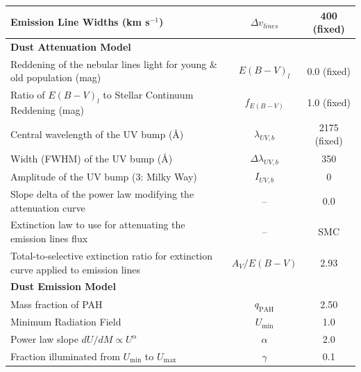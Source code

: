 \documentclass[twocolumn,tight,times,linenumbers]{aastex631}
\begin{document}
\begin{table}
\begin{tabular*}{\textwidth}{@{\extracolsep{\fill}}lcc}
				Emission Line Widths (km s$^{-1}$)											   &  $\Delta v_{lines}$       & 400 (fixed) \\
				\hline
				\textbf{Dust Attenuation Model} \citep{Calzetti2000}    &  &\\ 
				Reddening of the nebular lines light for young \& old population (mag) & $E(B-V)_l$ & 0.0 (fixed) \\
				Ratio of $E(B-V)_l$ to Stellar Continuum Reddening (mag) & $f_{E(B-V)}$ & 1.0 (fixed) \\
				Central wavelength of the UV bump (\AA)									  &     $\lambda_{UV,b}$   & 2175 (fixed) \\
				Width (FWHM) of the UV bump (\AA)											& $\Delta\lambda_{UV,b}$ & 350 \\
				Amplitude of the UV bump (3: Milky Way)									  &        $I_{UV,b}$ 				 & 0\\
				Slope delta of the power law modifying the attenuation curve &        -- 							  & 0.0 \\
				Extinction law to use for attenuating the emission lines flux    &        --                              & SMC \citep{Pei1992} \\
				Total-to-selective extinction ratio for extinction curve applied to emission lines & $A_V / E(B-V)$ & 2.93 \\
				\hline
				\textbf{Dust Emission Model} \citep{Draine2014} & & \\
				Mass fraction of PAH																	&       $q_\mathrm{PAH}$			&  2.50 \\
				Minimum Radiation Field																 &       $U_\mathrm{min}$            &   1.0 \\
				Power law slope $dU/dM \propto U^\alpha$								 &       $\alpha$               &    2.0 \\
				Fraction illuminated from $U_\mathrm{min}$ to $U_\mathrm{max}$ 				  &          $\gamma$           &    0.1 \\
				\hline
			\end{tabular*}
		\end{table}
		
\end{document}
